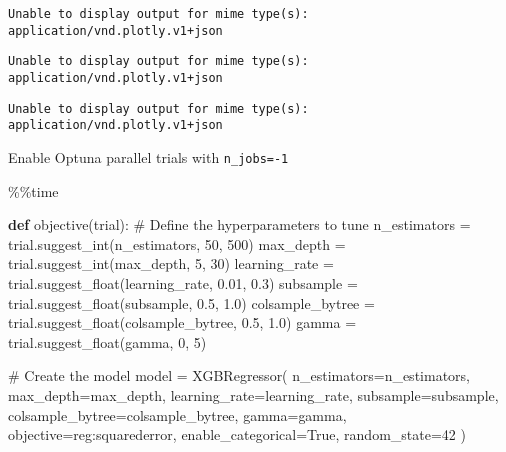 \documentclass[
  letterpaper,
  DIV=11,
  numbers=noendperiod]{scrreprt}
\newenvironment{Shaded}{\begin{snugshade}}{\end{snugshade}}
\newcommand{\CommentTok}[1]{\textcolor[rgb]{0.37,0.37,0.37}{#1}}
\newcommand{\DecValTok}[1]{\textcolor[rgb]{0.68,0.00,0.00}{#1}}
\newcommand{\FloatTok}[1]{\textcolor[rgb]{0.68,0.00,0.00}{#1}}
\newcommand{\KeywordTok}[1]{\textcolor[rgb]{0.00,0.23,0.31}{\textbf{#1}}}
\newcommand{\NormalTok}[1]{\textcolor[rgb]{0.00,0.23,0.31}{#1}}
\newcommand{\OperatorTok}[1]{\textcolor[rgb]{0.37,0.37,0.37}{#1}}
\newcommand{\StringTok}[1]{\textcolor[rgb]{0.13,0.47,0.30}{#1}}
\newcommand{\VariableTok}[1]{\textcolor[rgb]{0.07,0.07,0.07}{#1}}
\begin{document}
\begin{verbatim}
Unable to display output for mime type(s): application/vnd.plotly.v1+json
\end{verbatim}

\begin{verbatim}
Unable to display output for mime type(s): application/vnd.plotly.v1+json
\end{verbatim}

\begin{verbatim}
Unable to display output for mime type(s): application/vnd.plotly.v1+json
\end{verbatim}

Enable Optuna parallel trials with \texttt{n\_jobs=-1}

\begin{Shaded}
\begin{Highlighting}[]
\OperatorTok{\%\%}\NormalTok{time}

\KeywordTok{def}\NormalTok{ objective(trial):}
    \CommentTok{\# Define the hyperparameters to tune}
\NormalTok{    n\_estimators }\OperatorTok{=}\NormalTok{ trial.suggest\_int(}\StringTok{\textquotesingle{}n\_estimators\textquotesingle{}}\NormalTok{, }\DecValTok{50}\NormalTok{, }\DecValTok{500}\NormalTok{)}
\NormalTok{    max\_depth }\OperatorTok{=}\NormalTok{ trial.suggest\_int(}\StringTok{\textquotesingle{}max\_depth\textquotesingle{}}\NormalTok{, }\DecValTok{5}\NormalTok{, }\DecValTok{30}\NormalTok{)}
\NormalTok{    learning\_rate }\OperatorTok{=}\NormalTok{ trial.suggest\_float(}\StringTok{\textquotesingle{}learning\_rate\textquotesingle{}}\NormalTok{, }\FloatTok{0.01}\NormalTok{, }\FloatTok{0.3}\NormalTok{)}
\NormalTok{    subsample }\OperatorTok{=}\NormalTok{ trial.suggest\_float(}\StringTok{\textquotesingle{}subsample\textquotesingle{}}\NormalTok{, }\FloatTok{0.5}\NormalTok{, }\FloatTok{1.0}\NormalTok{)}
\NormalTok{    colsample\_bytree }\OperatorTok{=}\NormalTok{ trial.suggest\_float(}\StringTok{\textquotesingle{}colsample\_bytree\textquotesingle{}}\NormalTok{, }\FloatTok{0.5}\NormalTok{, }\FloatTok{1.0}\NormalTok{)}
\NormalTok{    gamma }\OperatorTok{=}\NormalTok{ trial.suggest\_float(}\StringTok{\textquotesingle{}gamma\textquotesingle{}}\NormalTok{, }\DecValTok{0}\NormalTok{, }\DecValTok{5}\NormalTok{)}

    \CommentTok{\# Create the model}
\NormalTok{    model }\OperatorTok{=}\NormalTok{ XGBRegressor(}
\NormalTok{        n\_estimators}\OperatorTok{=}\NormalTok{n\_estimators,}
\NormalTok{        max\_depth}\OperatorTok{=}\NormalTok{max\_depth,}
\NormalTok{        learning\_rate}\OperatorTok{=}\NormalTok{learning\_rate,}
\NormalTok{        subsample}\OperatorTok{=}\NormalTok{subsample,}
\NormalTok{        colsample\_bytree}\OperatorTok{=}\NormalTok{colsample\_bytree,}
\NormalTok{        gamma}\OperatorTok{=}\NormalTok{gamma,}
\NormalTok{        objective}\OperatorTok{=}\StringTok{\textquotesingle{}reg:squarederror\textquotesingle{}}\NormalTok{,}
\NormalTok{        enable\_categorical}\OperatorTok{=}\VariableTok{True}\NormalTok{,}
\NormalTok{        random\_state}\OperatorTok{=}\DecValTok{42}
\NormalTok{    )}


\end{Highlighting}
\end{Shaded}
\end{document}

